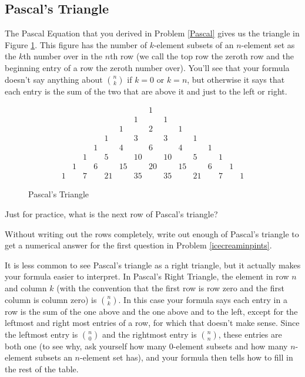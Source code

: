 \ep

\subsection{Pascal's Triangle}

The Pascal Equation that you derived in Problem \ref{Pascal}
gives us the triangle in Figure \ref{Pascaltriangle}.  This
figure has the number of $k$-element subsets of an $n$-element
set as the $k$th number over in the
$n$th row (we call the top row the zeroth row and the
beginning entry of a row the zeroth number over).  You'll see
that your formula doesn't say anything about
$n\choose k$ if
$k=0$ or
$k=n$, but otherwise it says that each entry is the sum of
the two that are above it and just to the left or right.  

\begin{figure}[h]\caption{Pascal's
Triangle}\label{Pascaltriangle}
$$\begin{matrix}
&&&&&&&1&&&&&&&\\
&&&&&&1&&1&&&&&&\\
&&&&&1&&2&&1&&&&&\\
&&&&1&&3&&3&&1&&&&\\
&&&1&&4&&6&&4&&1&&\\
&&1&&5&&10&&10&&5&&1&\\
&1&&6&&15&&20&&15&&6&&1\\
1&&7&&21&&35&&35&&21&&7&&1
\end{matrix}$$
\end{figure}


\bp
\itemx Just for practice, what is the next row of Pascal's triangle?

\itemi Without writing out the rows completely, write out enough of Pascal's
triangle to get a numerical answer for the first question  in Problem
\ref{icecreaminpints}.
\ep

It is less common to see Pascal's triangle as a right
triangle, but it actually makes your formula easier to
interpret.  In Pascal's Right Triangle, the element in row $n$
and column $k$ (with the convention that the first row is row
zero and the first column is column zero) is $n\choose k$.  In
this case your formula says each entry in a row is the sum of
the one above and the one above and to the left, except for
the leftmost and right most entries of a row, for which that
doesn't make sense.  Since the leftmost entry is $n\choose 0$
and the rightmost entry is
$n\choose n$, these entries are both one (to see why, ask yourself how
many $0$-element subsets and how many $n$-element subsets an
$n$-element set has), and
your formula then tells how to fill in the rest of the table.

